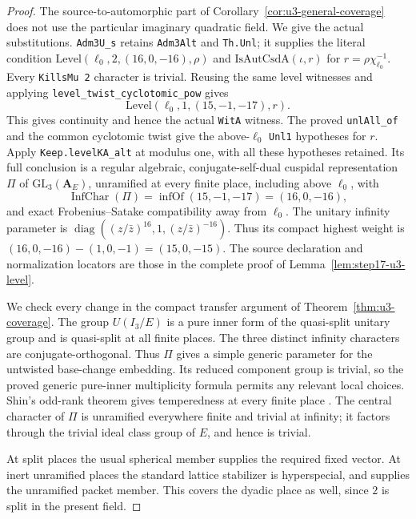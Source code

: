 \documentclass[11pt,a4paper]{article}
\theoremstyle{definition}
\begin{document}
\begin{proof}
The source-to-automorphic part of
Corollary~\ref{cor:u3-general-coverage} does not use the particular
imaginary quadratic field. We give the actual substitutions.
\texttt{Adm3U\_s} retains \texttt{Adm3Alt} and \texttt{Th.Unl};
it supplies the literal condition
\(\mathrm{Level}(\ell_0,2,(16,0,-16),\rho)\) and
\(\mathrm{IsAutCsdA}(\iota,r)\) for \(r=\rho\chi_{\ell_0}^{-1}\).
Every \texttt{KillsMu 2} character is trivial. Reusing the same level
witnesses and applying \texttt{level\_twist\_cyclotomic\_pow} gives
\[
 \mathrm{Level}(\ell_0,1,(15,-1,-17),r).
 \tag{S7.2}
\]
This gives continuity and hence the actual \texttt{WitA} witness.
The proved \texttt{unlAll\_of} and the common cyclotomic twist give
the above-\(\ell_0\) \texttt{Unl1} hypotheses for \(r\).
Apply \texttt{Keep.levelKA\_alt} at modulus one, with all these
hypotheses retained. Its full conclusion is a regular algebraic,
conjugate-self-dual cuspidal representation \(\Pi\) of
\(\mathrm{GL}_3(\mathbf A_E)\), unramified at every finite place,
including above \(\ell_0\), with
\[
 \operatorname{InfChar}(\Pi)=\operatorname{infOf}(15,-1,-17)
 =(16,0,-16),
\]
and exact Frobenius--Satake compatibility away from \(\ell_0\).
The unitary infinity parameter is
\(\operatorname{diag}((z/\bar z)^{16},1,(z/\bar z)^{-16})\).
Thus its compact highest weight is
\((16,0,-16)-(1,0,-1)=(15,0,-15)\).
The source declaration and normalization locators are those in the
complete proof of Lemma~\ref{lem:step17-u3-level}.

We check every change in the compact transfer argument of
Theorem~\ref{thm:u3-coverage}. The group \(U(I_3/E)\) is a pure inner
form of the quasi-split unitary group and is quasi-split at all finite
places. The three distinct infinity characters are
conjugate-orthogonal. Thus \(\Pi\) gives a simple generic parameter
for the untwisted base-change embedding. Its reduced component group
is trivial, so the proved generic pure-inner multiplicity formula
\cite[Theorem~5.0.5, p.~206; \S1.3.4--1.3.5, pp.~69--70]{K17KMSW2014}
permits any relevant local choices. Shin's odd-rank theorem gives
temperedness at every finite place
\cite[Theorem~1.2 and Corollary~1.3, pp.~1647--1648;
Corollary~7.9, p.~1728]{K17Shin2011}.
The central character of \(\Pi\) is unramified everywhere finite and
trivial at infinity; it factors through the trivial ideal class group
of \(E\), and hence is trivial.

At split places the usual spherical member supplies the required
fixed vector. At inert unramified places the standard lattice
stabilizer is hyperspecial, and
\cite[Proposition~1.5.2(5), p.~79]{K17KMSW2014} supplies the
unramified packet member. This covers the dyadic place as well,
since \(2\) is split in the present field.


\end{proof}
\end{document}

